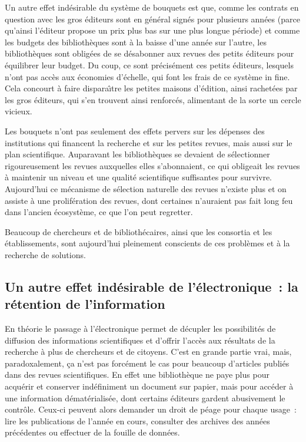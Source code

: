 Un autre effet ind{\'e}sirable du syst{\`e}me de bouquets est que, comme les contrats en question avec les gros {\'e}diteurs sont en g{\'e}n{\'e}ral sign{\'e}s pour plusieurs
ann{\'e}es (parce qu'ainsi l'{\'e}diteur propose un prix plus bas sur une plus longue p{\'e}riode) et comme les budgets des biblioth{\`e}ques sont {\`a} la baisse d'une
ann{\'e}e sur l'autre, les biblioth{\`e}ques sont oblig{\'e}es de se d{\'e}sabonner aux revues des petits {\'e}diteurs pour {\'e}quilibrer leur budget. Du coup, ce sont pr{\'e}cis{\'e}ment
ces petits {\'e}diteurs, lesquels n'ont pas acc{\`e}s aux {\'e}conomies d'{\'e}chelle, qui font les frais de ce syst{\`e}me in fine. Cela concourt {\`a} faire dispara{\^\i}tre les
petites maisons d'{\'e}dition, ainsi rachet{\'e}es par les gros {\'e}diteurs, qui s'en trouvent ainsi renforc{\'e}s, alimentant de la sorte un cercle vicieux.

Les bouquets n'ont pas seulement des effets pervers sur les d{\'e}penses des institutions qui financent la recherche et sur les petites revues, mais aussi
sur le plan scientifique. Auparavant les biblioth{\`e}ques se devaient de s{\'e}lectionner rigoureusement les revues auxquelles elles s'abonnaient, ce qui
obligeait les revues {\`a} maintenir un niveau et une qualit{\'e} scientifique suffisantes pour survivre. Aujourd'hui ce m{\'e}canisme de s{\'e}lection naturelle des
revues n'existe plus et on assiste {\`a} une prolif{\'e}ration des revues, dont certaines n'auraient pas fait long feu dans l'ancien {\'e}cosyst{\`e}me, ce que l'on
peut regretter.

Beaucoup de chercheurs et de biblioth{\'e}caires, ainsi que les consortia et les {\'e}tablissements, sont aujourd'hui pleinement
conscients de ces probl{\`e}mes et {\`a} la recherche de solutions.

\subsection{Un autre effet ind{\'e}sirable de l'{\'e}lectronique~: la r{\'e}tention de l'information}

En th{\'e}orie le passage {\`a} l'{\'e}lectronique permet de d{\'e}cupler les possibilit{\'e}s de diffusion des informations scientifiques et d'offrir l'acc{\`e}s aux r{\'e}sultats
de la recherche {\`a} plus de chercheurs et de citoyens. C'est en grande partie vrai, mais, paradoxalement, {\c c}a n'est pas forc{\'e}ment le cas pour beaucoup
d'articles publi{\'e}s dans des revues scientifiques. En effet une biblioth{\`e}que ne paye plus pour acqu{\'e}rir et conserver ind{\'e}finiment un document sur papier,
mais pour acc{\'e}der {\`a} une information d{\'e}mat{\'e}rialis{\'e}e, dont certains {\'e}diteurs gardent abusivement le contr{\^o}le. Ceux-ci peuvent alors demander un droit de p{\'e}age
pour chaque usage~: lire les publications de l'ann{\'e}e en cours, consulter des archives des ann{\'e}es pr{\'e}c{\'e}dentes ou effectuer de la fouille de donn{\'e}es.

